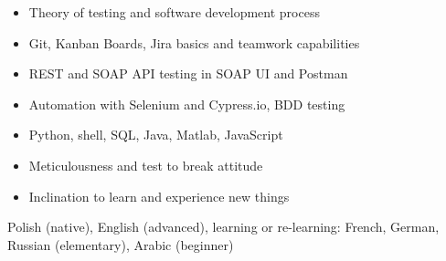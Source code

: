 \documentclass[a4paper,12pt]{memoir} %
\begin{document}
{\begin{itemize}
    \item[\bluebullet] Theory of testing and software development process
    \item[\bluebullet] Git, Kanban Boards, Jira basics and teamwork capabilities
    \item[\bluebullet] REST and SOAP API testing in SOAP UI and Postman
    \item[\bluebullet] Automation with Selenium and Cypress.io, BDD testing
    \item[\bluebullet] Python, shell, SQL, Java, Matlab, JavaScript
    \item[\bluebullet] Meticulousness and test to break attitude
    \item[\bluebullet] Inclination to learn and experience new things
\end{itemize}}
%
%
%
{Polish (native), English (advanced), learning or re-learning: French, German,
Russian (elementary), Arabic (beginner)}
% 
\Sep %
\end{document}
